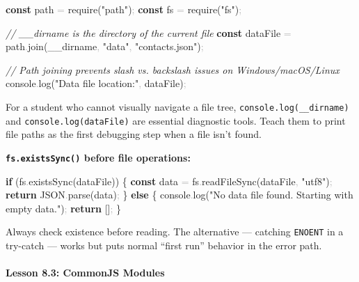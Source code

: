 \documentclass[
  justified,
  openright,
]{tufte-book}
\let\subsection\paragraph
\let\paragraph\paragraph
\newcommand{\KeywordTok}[1]{\textcolor{CodeKeyword}{\textbf{#1}}}  %
\newcommand{\StringTok}[1]{\textcolor{CodeString}{#1}}              %
\newcommand{\CommentTok}[1]{\textcolor{CodeComment}{\textit{#1}}}  %
\newcommand{\CodeFuncTok}[1]{\textcolor{CodeKeyword}{#1}}           %
\newcommand{\CodeAccentTok}[1]{\textcolor{CodeAccent}{#1}}          %
\newcommand{\OperatorTok}[1]{\textcolor{DarkGray}{#1}}              %
\newenvironment{Shaded}{%
  \begin{mdframed}[style=TufteCode]%
}{%
  \end{mdframed}%
}
\let\subsection\paragraph
\let\paragraph\paragraph
\begin{document}
\begin{Shaded}
\begin{Highlighting}[]
\KeywordTok{const} path \OperatorTok{=} \CodeAccentTok{require}(\StringTok{"path"})\OperatorTok{;}
\KeywordTok{const} fs \OperatorTok{=} \CodeAccentTok{require}(\StringTok{"fs"})\OperatorTok{;}
 
\CommentTok{// \_\_dirname is the directory of the current file}
\KeywordTok{const} dataFile \OperatorTok{=} path\OperatorTok{.}\CodeFuncTok{join}(\_\_dirname\OperatorTok{,} \StringTok{"data"}\OperatorTok{,} \StringTok{"contacts.json"})\OperatorTok{;}
 
\CommentTok{// Path joining prevents slash vs. backslash issues on Windows/macOS/Linux}
console\OperatorTok{.}\CodeFuncTok{log}(\StringTok{"Data file location:"}\OperatorTok{,} dataFile)\OperatorTok{;}
\end{Highlighting}
\end{Shaded}

For a student who cannot visually navigate a file tree,
\texttt{console.log(\_\_dirname)} and \texttt{console.log(dataFile)} are
essential diagnostic tools. Teach them to print file paths as the first
debugging step when a file isn't found.

\textbf{\texttt{fs.existsSync()} before file operations:}

\begin{Shaded}
\begin{Highlighting}[]
\KeywordTok{if} (fs\OperatorTok{.}\CodeFuncTok{existsSync}(dataFile)) \{
  \KeywordTok{const} data \OperatorTok{=} fs\OperatorTok{.}\CodeFuncTok{readFileSync}(dataFile\OperatorTok{,} \StringTok{"utf8"})\OperatorTok{;}
  \KeywordTok{return} JSON\OperatorTok{.}\CodeFuncTok{parse}(data)\OperatorTok{;}
\} \KeywordTok{else} \{
  console\OperatorTok{.}\CodeFuncTok{log}(\StringTok{"No data file found. Starting with empty data."})\OperatorTok{;}
  \KeywordTok{return} []\OperatorTok{;}
\}
\end{Highlighting}
\end{Shaded}

Always check existence before reading. The alternative --- catching
\texttt{ENOENT} in a try-catch --- works but puts normal ``first run''
behavior in the error path.

\subsection{Lesson 8.3: CommonJS
Modules}\label{lesson-8.3-commonjs-modules}
\end{document}
